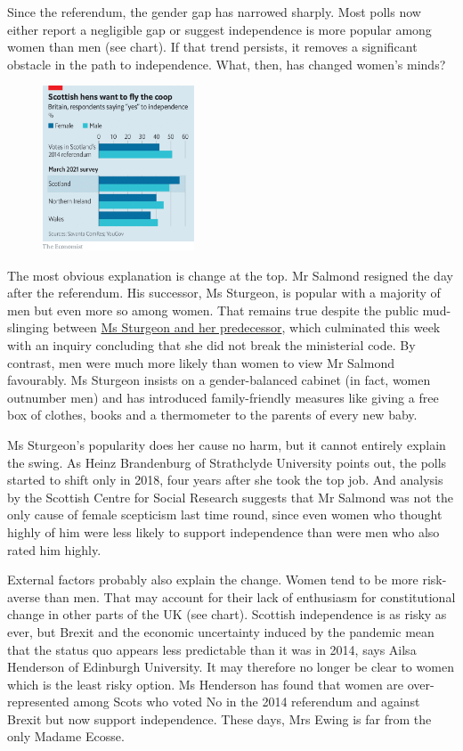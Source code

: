 \documentclass{article}
\begin{document}
Since the referendum, the gender gap has narrowed sharply. Most polls now either report a negligible gap or suggest independence is more popular among women than men (see chart). If that trend persists, it removes a significant obstacle in the path to independence. What, then, has changed women's minds? 

\begin{figure}[h]
\centering
\includegraphics[width=0.4\textwidth]{images/20210327_BRC103.png}
\end{figure}


The most obvious explanation is change at the top. Mr Salmond resigned the day after the referendum. His successor, Ms Sturgeon, is popular with a majority of men but even more so among women. That remains true despite the public mud-slinging between \href{/node/21799714}{Ms Sturgeon and her predecessor}, which culminated this week with an inquiry concluding that she did not break the ministerial code. By contrast, men were much more likely than women to view Mr Salmond favourably. Ms Sturgeon insists on a gender-balanced cabinet (in fact, women outnumber men) and has introduced family-friendly measures like giving a free box of clothes, books and a thermometer to the parents of every new baby. 

Ms Sturgeon's popularity does her cause no harm, but it cannot entirely explain the swing. As Heinz Brandenburg of Strathclyde University points out, the polls started to shift only in 2018, four years after she took the top job. And analysis by the Scottish Centre for Social Research suggests that Mr Salmond was not the only cause of female scepticism last time round, since even women who thought highly of him were less likely to support independence than were men who also rated him highly. 

External factors probably also explain the change. Women tend to be more risk-averse than men. That may account for their lack of enthusiasm for constitutional change in other parts of the UK (see chart). Scottish independence is as risky as ever, but Brexit and the economic uncertainty induced by the pandemic mean that the status quo appears less predictable than it was in 2014, says Ailsa Henderson of Edinburgh University. It may therefore no longer be clear to women which is the least risky option. Ms Henderson has found that women are over-represented among Scots who voted No in the 2014 referendum and against Brexit but now support independence. These days, Mrs Ewing is far from the only Madame Ecosse. {} 
\clearpage
\end{document}
